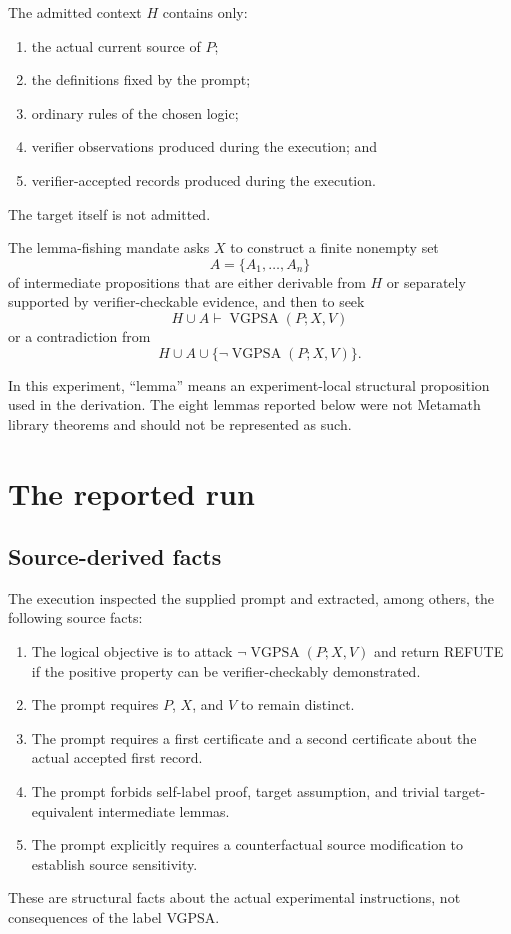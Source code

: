 \documentclass[11pt]{article}
\theoremstyle{remark}
\newcommand{\VGPSA}{\operatorname{VGPSA}}
\begin{document}
The admitted context $H$ contains only:
\begin{enumerate}[label=(\arabic*)]
\item the actual current source of $P$;
\item the definitions fixed by the prompt;
\item ordinary rules of the chosen logic;
\item verifier observations produced during the execution; and
\item verifier-accepted records produced during the execution.
\end{enumerate}
The target itself is not admitted.

The lemma-fishing mandate asks $X$ to construct a finite nonempty set
\[
A=\{A_1,\dots,A_n\}
\]
of intermediate propositions that are either derivable from $H$ or separately supported by verifier-checkable evidence, and then to seek
\[
H\cup A\vdash \VGPSA(P;X,V)
\]
or a contradiction from
\[
H\cup A\cup\{\neg\VGPSA(P;X,V)\}.
\]

In this experiment, ``lemma'' means an experiment-local structural proposition used in the derivation. The eight lemmas reported below were not Metamath library theorems and should not be represented as such.

\section{The reported run}

\subsection{Source-derived facts}

The execution inspected the supplied prompt and extracted, among others, the following source facts:
\begin{enumerate}[label=\textbf{F\arabic*.}]
\item The logical objective is to attack $\neg\VGPSA(P;X,V)$ and return REFUTE if the positive property can be verifier-checkably demonstrated.
\item The prompt requires $P$, $X$, and $V$ to remain distinct.
\item The prompt requires a first certificate and a second certificate about the actual accepted first record.
\item The prompt forbids self-label proof, target assumption, and trivial target-equivalent intermediate lemmas.
\item The prompt explicitly requires a counterfactual source modification to establish source sensitivity.
\end{enumerate}
These are structural facts about the actual experimental instructions, not consequences of the label VGPSA.
\end{document}
